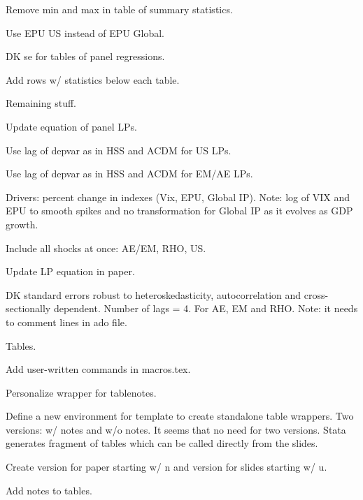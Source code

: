 \documentclass[12pt]{article}
\newcommand{\cmark}{\ding{51}}
\newcommand{\xmark}{\ding{55}}
\newcommand{\done}{\rlap{$\square$}{\raisebox{2pt}{\large\hspace{1pt}\cmark}}%
	\hspace{-2.5pt}}
\newcommand{\wontdo}{\rlap{$\square$}{\large\hspace{1pt}\xmark}}
\begin{document}
\begin{todolist}
\begin{todolist}
		\item[\done] Remove min and max in table of summary statistics.
		\item[\done] Use EPU US instead of EPU Global.
		\item[\done] DK se for tables of panel regressions.
		 \item[\done] Add rows w/ statistics below each table.
	\end{todolist}
	\item[\done] Remaining stuff.
	\begin{todolist}
		\item[\done] Update equation of panel LPs.
		\item[\done] Use lag of depvar as in HSS and ACDM for US LPs.
		\item[\done] Use lag of depvar as in HSS and ACDM for EM/AE LPs.
		\item[\done] Drivers: percent change in indexes (Vix, EPU, Global IP). Note: log of VIX and EPU to smooth spikes and no transformation for Global IP as it evolves as GDP growth.
		\item[\done] Include all shocks at once: AE/EM, RHO, US.
		\item[\done] Update LP equation in paper.
		\item[\done] DK standard errors robust to heteroskedasticity, autocorrelation and cross-sectionally dependent. Number of lags = 4. For AE, EM and RHO. Note: it needs to comment lines in ado file.
	\end{todolist}
	
	\item[\done] Tables.
	\begin{todolist}
		\item[\done] Add user-written commands in macros.tex.
		\item[\done] Personalize wrapper for tablenotes.
		\item[\wontdo] Define a new environment for template to create standalone table wrappers. Two versions: w/ notes and w/o notes. It seems that no need for two versions. Stata generates fragment of tables which can be called directly from the slides.
		\item[\wontdo] Create version for paper starting w/ n and version for slides starting w/ u.
		\item[\done] Add notes to tables.
	\end{todolist}
	

\end{todolist}
\end{document}
